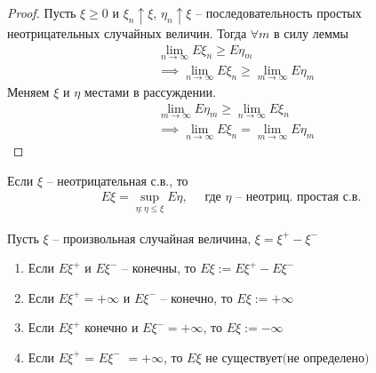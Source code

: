 \begin{proof}
  Пусть $\xi \geq 0$ и $\xi_n \uparrow \xi$,\; $\eta_n \uparrow \xi$ -- последовательность простых неотрицательных случайных величин. Тогда $\forall m$ в силу леммы
  \begin{align*}
    &\lim_{n \to \infty} E \xi_n \geq E \eta_m\\
    &\implies \lim_{n \to \infty} E \xi_n \geq \lim_{m \to \infty} E \eta_m
  \end{align*}
  Меняем $\xi$ и $\eta$ местами в рассуждении.
  \begin{align*}
    &\lim_{m \to \infty} E \eta_m \geq \lim_{n \to \infty} E \xi_n\\
    &\implies \lim_{n \to \infty} E \xi_n = \lim_{m \to \infty} E \eta_m
  \end{align*}
\end{proof}

\begin{remark}
  Если $\xi$ -- неотрицательная с.в., то
  \begin{align*}
    E\xi = \sup_{\eta: \eta \leq \xi} E\eta, \quad \text{ где $\eta$ -- неотриц. простая с.в.}
  \end{align*}
\end{remark}


\begin{definition}
  Пусть $\xi$ -- произвольная случайная величина, $\xi = \xi^+ - \xi^-$

  \begin{enumerate}
    \item 
      Если $E \xi^+$ и $E \xi^-$ -- конечны, то 
      $\boxed{E\xi := E \xi^+ - E \xi^-}$

    \item 
      Если $E \xi^+ = +\infty$ и $E \xi^-$ -- конечно, то $\boxed{E\xi := +\infty}$

    \item
      Если $E \xi^+$ конечно и $E \xi^- = +\infty$, то $\boxed{E\xi := -\infty}$

    \item 
      Если $E \xi^+$ = $E \xi^-$ $= +\infty$, то $E \xi \text{ не существует(не определено)}$

  \end{enumerate}
\end{definition}

